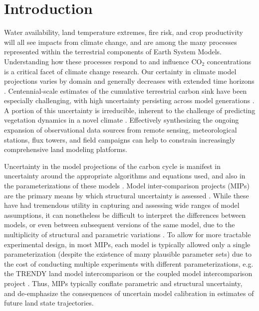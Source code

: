 \documentclass[draft]{agujournal2019}
\begin{document}
\begin{abstract}
[ enter your Abstract here ]
\end{abstract}


\section{Introduction}
Water availability, land temperature extremes, fire risk, and crop productivity will all see impacts from climate change, and are among the many processes represented within the terrestrial components of Earth System Models. Understanding how these processes respond to and influence CO$_2$ concentrations is a critical facet of climate change research. Our certainty in climate model projections varies by domain and generally decreases with extended time horizons \cite{koven2022}. Centennial-scale estimates of the cumulative terrestrial carbon sink have been especially challenging, with high uncertainty persisting across model generations \cite{friedlingstein2014,arora2020}. A portion of this uncertainty is irreducible, inherent to the challenge of predicting vegetation dynamics in a novel climate \cite{lovenduski2017}. Effectively synthesizing the ongoing expansion of observational data sources from remote sensing, meteorological stations, flux towers, and field campaigns can help to constrain increasingly comprehensive land modeling platforms. 

Uncertainty in the model projections of the carbon cycle is manifest in uncertainty around the appropriate algorithms and equations used, and also in the parameterizations of these models \cite{luo2020}. Model inter-comparison projects (MIPs) are the primary means by which structural uncertainty is assessed \cite{henderson-sellers1995,pitman1999,wood1998,schlosser2000,eyring2016,friedlingstein2022}. While these have had tremendous utility in capturing and assessing wide ranges of model assumptions, it can nonetheless be difficult to interpret the differences between models, or even between subsequent versions of the same model, due to the multiplicity of structural and parametric variations \cite{mcneall2016}. To allow for more tractable experimental design, in most MIPs, each model is typically allowed only a single parameterization (despite the existence of many plausible parameter sets) due to the cost of conducting multiple experiments with different parameterizations, e.g. the TRENDY land model intercomparison or the coupled model intercomparison project \cite{friedlingstein2022,eyring2016}. Thus, MIPs typically conflate parametric and structural uncertainty, and de-emphasize the consequences of uncertain model calibration in estimates of future land state trajectories. 
\end{document}
